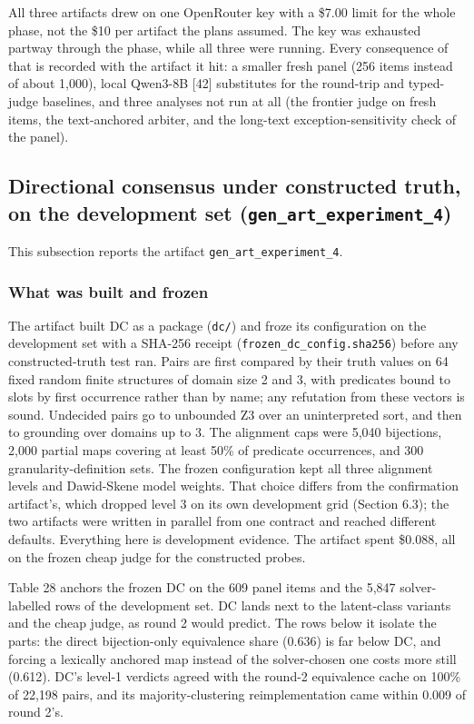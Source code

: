 \documentclass[11pt,letterpaper]{article}
\begin{document}
All three artifacts drew on one OpenRouter key with a \$7.00 limit for the whole phase, not the \$10 per artifact the plans assumed. The key was exhausted partway through the phase, while all three were running. Every consequence of that is recorded with the artifact it hit: a smaller fresh panel (256 items instead of about 1,000), local Qwen3-8B [42] substitutes for the round-trip and typed-judge baselines, and three analyses not run at all (the frontier judge on fresh items, the text-anchored arbiter, and the long-text exception-sensitivity check of the panel).

\subsection{Directional consensus under constructed truth, on the development set (\texorpdfstring{\textup{\nolinkurl{gen_art_experiment_4}}}{gen art experiment 4})}

This subsection reports the artifact \texorpdfstring{\textup{\nolinkurl{gen_art_experiment_4}}}{gen art experiment 4}.

\subsubsection{What was built and frozen}

The artifact built DC as a package (\texttt{dc/\allowbreak{}}) and froze its configuration on the development set with a SHA-256 receipt (\texttt{frozen\_\allowbreak{}\allowbreak{}dc\_\allowbreak{}\allowbreak{}config.sha256}) before any constructed-truth test ran. Pairs are first compared by their truth values on 64 fixed random finite structures of domain size 2 and 3, with predicates bound to slots by first occurrence rather than by name; any refutation from these vectors is sound. Undecided pairs go to unbounded Z3 over an uninterpreted sort, and then to grounding over domains up to 3. The alignment caps were 5,040 bijections, 2,000 partial maps covering at least 50\% of predicate occurrences, and 300 granularity-definition sets. The frozen configuration kept all three alignment levels and Dawid-Skene model weights. That choice differs from the confirmation artifact's, which dropped level 3 on its own development grid (Section 6.3); the two artifacts were written in parallel from one contract and reached different defaults. Everything here is development evidence. The artifact spent \$0.088, all on the frozen cheap judge for the constructed probes.

Table 28 anchors the frozen DC on the 609 panel items and the 5,847 solver-labelled rows of the development set. DC lands next to the latent-class variants and the cheap judge, as round 2 would predict. The rows below it isolate the parts: the direct bijection-only equivalence share (0.636) is far below DC, and forcing a lexically anchored map instead of the solver-chosen one costs more still (0.612). DC's level-1 verdicts agreed with the round-2 equivalence cache on 100\% of 22,198 pairs, and its majority-clustering reimplementation came within 0.009 of round 2's.
\end{document}
